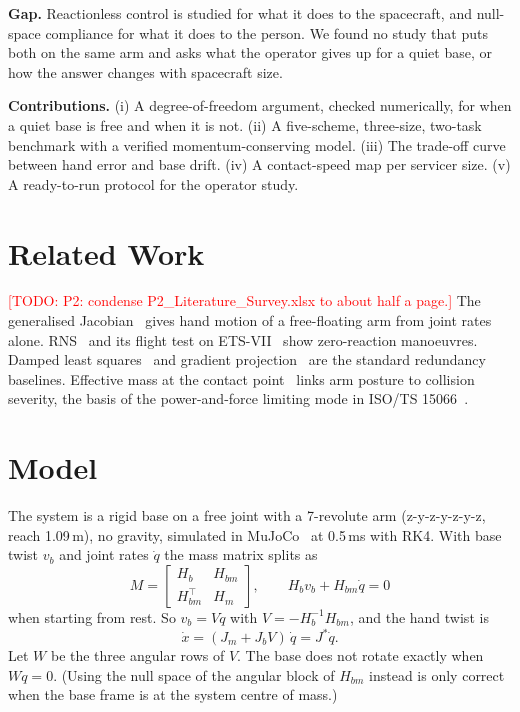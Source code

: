 \documentclass[conference]{IEEEtran}
\newcommand{\todo}[1]{\textcolor{red}{[TODO: #1]}}
\newcommand{\qd}{\dot{q}}
\begin{document}
\textbf{Gap.} Reactionless control is studied for what it does to the spacecraft, and null-space
compliance for what it does to the person. We found no study that puts both on the same arm and
asks what the operator gives up for a quiet base, or how the answer changes with spacecraft size.

\textbf{Contributions.} (i) A degree-of-freedom argument, checked numerically, for when a quiet
base is free and when it is not. (ii) A five-scheme, three-size, two-task benchmark with a
verified momentum-conserving model. (iii) The trade-off curve between hand error and base drift.
(iv) A contact-speed map per servicer size. (v) A ready-to-run protocol for the operator study.

\section{Related Work}
\todo{P2: condense P2\_Literature\_Survey.xlsx to about half a page.}
The generalised Jacobian~\cite{umetani1989} gives hand motion of a free-floating arm from joint
rates alone. RNS~\cite{nenchev1999} and its flight test on ETS-VII~\cite{yoshida2001} show
zero-reaction manoeuvres. Damped least squares~\cite{nakamura1986} and gradient
projection~\cite{liegeois1977} are the standard redundancy baselines. Effective mass at the
contact point~\cite{khatib1995} links arm posture to collision severity, the basis of the
power-and-force limiting mode in ISO/TS 15066~\cite{iso15066,haddadin2012}.

\section{Model}
The system is a rigid base on a free joint with a 7-revolute arm (z-y-z-y-z-y-z, reach 1.09\,m),
no gravity, simulated in MuJoCo~\cite{todorov2012} at 0.5\,ms with RK4. With base twist $v_b$ and
joint rates $\qd$ the mass matrix splits as
\begin{equation}
M=\begin{bmatrix}H_b & H_{bm}\\ H_{bm}^{\!\top} & H_m\end{bmatrix},\qquad
H_b v_b + H_{bm}\qd = 0
\end{equation}
when starting from rest. So $v_b = V\qd$ with $V=-H_b^{-1}H_{bm}$, and the hand twist is
\begin{equation}
\dot{x} = (J_m + J_b V)\,\qd = J^{*}\qd .
\end{equation}
Let $W$ be the three angular rows of $V$. The base does not rotate exactly when $W\qd=0$.
(Using the null space of the angular block of $H_{bm}$ instead is only correct when the base frame
is at the system centre of mass.)
\end{document}
